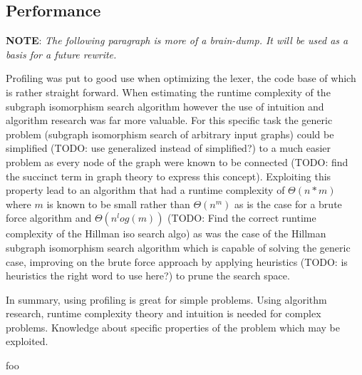 
\subsection{Performance}


\textbf{NOTE}: \textit{The following paragraph is more of a brain-dump. It will be used as a basis for a future rewrite.}

Profiling was put to good use when optimizing the lexer, the code base of which is rather straight forward. When estimating the runtime complexity of the subgraph isomorphism search algorithm however the use of intuition and algorithm research was far more valuable. For this specific task the generic problem (subgraph isomorphism search of arbitrary input graphs) could be simplified (TODO: use generalized instead of simplified?) to a much easier problem as every node of the graph were known to be connected (TODO: find the succinct term in graph theory to express this concept). Exploiting this property lead to an algorithm that had a runtime complexity of $ \Theta(n*m) $ where $ m $ is known to be small rather than $ \Theta(n^m) $ as is the case for a brute force algorithm and $ \Theta(n^log(m)) $ (TODO: Find the correct runtime complexity of the Hillman iso search algo) as was the case of the Hillman subgraph isomorphism search algorithm which is capable of solving the generic case, improving on the brute force approach by applying heuristics (TODO: is heuristics the right word to use here?) to prune the search space.

In summary, using profiling is great for simple problems. Using algorithm research, runtime complexity theory and intuition is needed for complex problems. Knowledge about specific properties of the problem which may be exploited.

foo
